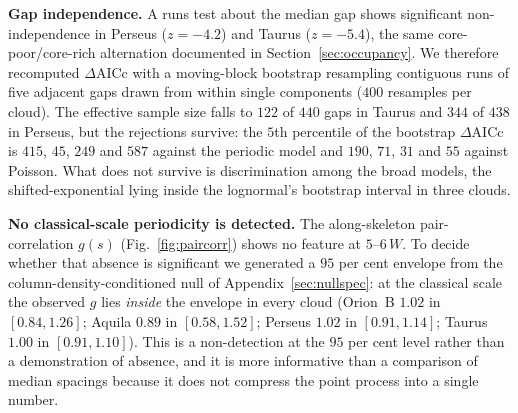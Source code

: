 \documentclass[usenatbib,twoside,twocolumn]{mnras}
\begin{document}
\smallskip\noindent\textbf{Gap independence.} A runs test about the median gap shows significant non-independence in Perseus ($z=-4.2$) and Taurus ($z=-5.4$), the same core-poor/core-rich alternation documented in Section~\ref{sec:occupancy}. We therefore recomputed $\Delta$AICc with a moving-block bootstrap resampling contiguous runs of five adjacent gaps drawn from within single components ($400$ resamples per cloud). The effective sample size falls to $122$ of $440$ gaps in Taurus and $344$ of $438$ in Perseus, but the rejections survive: the $5$th percentile of the bootstrap $\Delta$AICc is $415$, $45$, $249$ and $587$ against the periodic model and $190$, $71$, $31$ and $55$ against Poisson. What does not survive is discrimination among the broad models, the shifted-exponential lying inside the lognormal's bootstrap interval in three clouds.

\smallskip\noindent\textbf{No classical-scale periodicity is detected.} The along-skeleton pair-correlation $g(s)$ (Fig.~\ref{fig:paircorr}) shows no feature at $5$--$6\,W$. To decide whether that absence is significant we generated a $95$ per cent envelope from the column-density-conditioned null of Appendix~\ref{sec:nullspec}: at the classical scale the observed $g$ lies \emph{inside} the envelope in every cloud (Orion~B $1.02$ in $[0.84,1.26]$; Aquila $0.89$ in $[0.58,1.52]$; Perseus $1.02$ in $[0.91,1.14]$; Taurus $1.00$ in $[0.91,1.10]$). This is a non-detection at the $95$ per cent level rather than a demonstration of absence, and it is more informative than a comparison of median spacings because it does not compress the point process into a single number.
\end{document}
